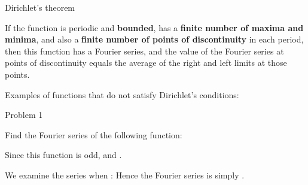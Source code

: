 \EMhold


\begin{EMtheorem}{Dirichlet's theorem}

If the function  is periodic and \textbf{bounded}, has a \textbf{finite number of maxima and minima}, and also a \textbf{finite number of points of discontinuity} in each period, then this function has a Fourier series, and the value of the Fourier series at points of discontinuity equals the average of the right and left limits at those points.

\end{EMtheorem}

\begin{EMunit}

Examples of functions that do not satisfy Dirichlet's conditions:



\end{EMunit}

\EMhold


\begin{EMexample}{Problem 1}

Find the Fourier series of the following function:
\EMdisp{f(x)\EMbr =\sin\alpha x,\qquad\EMbr  \alpha\in\mathbb{R},\qquad\EMbr  x\in[-\pi,\pi),\qquad\EMbr  f(x+2\pi)\EMbr =f(x)}

Since this function is odd,  and .

We examine the series when :
Hence the Fourier series is simply .

\end{EMexample}

